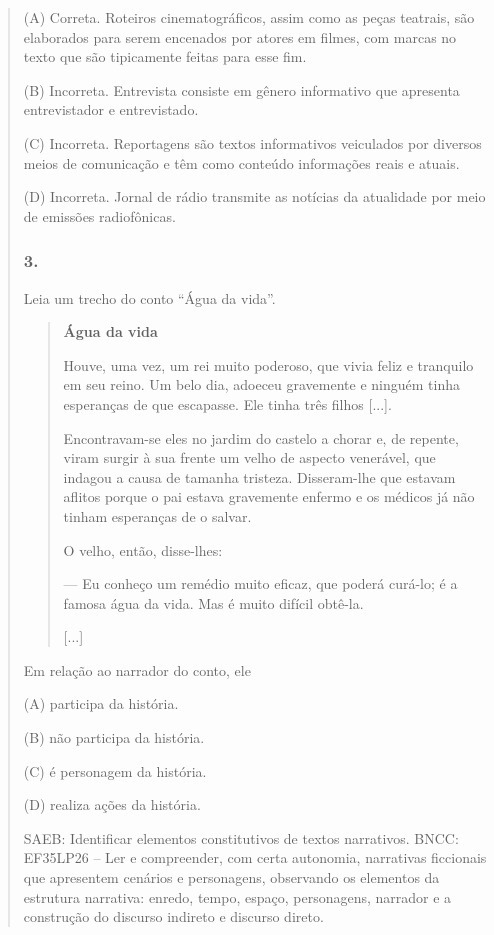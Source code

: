 \begin{quote}
(A) Correta. Roteiros cinematográficos, assim como as peças teatrais,
são elaborados para serem encenados por atores em filmes, com marcas
no texto que são tipicamente feitas para esse fim.

(B) Incorreta. Entrevista consiste em gênero informativo que apresenta
entrevistador e entrevistado.

(C) Incorreta. Reportagens são textos informativos veiculados por
diversos meios de comunicação e têm como conteúdo informações reais e
atuais.

(D) Incorreta. Jornal de rádio transmite as notícias da atualidade por
meio de emissões radiofônicas.

\subsubsection{3. }\label{section-31}

Leia um trecho do conto ``Água da vida''.

\begin{quote}
\textbf{Água da vida}

Houve, uma vez, um rei muito poderoso, que vivia feliz e tranquilo em
seu reino. Um belo dia, adoeceu gravemente e ninguém tinha esperanças de
que escapasse. Ele tinha três filhos {[}...{]}.

Encontravam-se eles no jardim do castelo a chorar e, de repente, viram
surgir à sua frente um velho de aspecto venerável, que indagou a causa
de tamanha tristeza. Disseram-lhe que estavam aflitos porque o pai
estava gravemente enfermo e os médicos já não tinham esperanças de o
salvar.

O velho, então, disse-lhes:

--- Eu conheço um remédio muito eficaz, que poderá curá-lo; é a famosa
água da vida. Mas é muito difícil obtê-la.

{[}...{]}

\end{quote}

Em relação ao narrador do conto, ele

(A) participa da história.

(B) não participa da história.

(C) é personagem da história.

(D) realiza ações da história.

SAEB: Identificar elementos constitutivos de textos narrativos.
BNCC: EF35LP26 -- Ler e compreender, com certa autonomia, narrativas
ficcionais que apresentem cenários e personagens, observando os
elementos da estrutura narrativa: enredo, tempo, espaço, personagens,
narrador e a construção do discurso indireto e discurso direto.


\end{quote}
